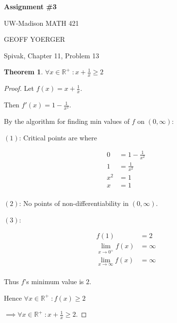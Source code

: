\documentclass{article} %
\theoremstyle{plain}
\newtheorem*{theorem*}{Theorem}
\theoremstyle{definition}
\begin{document}
\begin{center}
    \Large{
        \textbf{Assignment \#3}

        UW-Madison MATH 421
    }
    
    \vspace{5pt}
        
    \normalsize{
        GEOFF YOERGER

        \usdate
    }
    
    \vspace{15pt}
\end{center}

\noindent{} Spivak, Chapter 11, Problem 13

\begin{theorem*}
    $\forall x \in \mathbb{R}^+ \; \colon x + \frac{1}{x} \geq 2$
\end{theorem*}

\begin{proof}
    Let $f(x) = x + \frac{1}{x}$.

    Then $f'(x) = 1 - \frac{1}{x^2}$.

    By the algorithm for finding min values of $f$ on $(0, \infty)$:

    $(1)$: Critical points are where

    \begin{align*}
        0 & = 1 - \frac{1}{x^2} \\
        1 & =  \frac{1}{x^2} \\
        x^2 & = 1 \\
        x & = 1 \\
    \end{align*}

    $(2)$: No points of non-differentiability in $(0, \infty)$.

    $(3)$:

    \begin{align*}
        f(1) & = 2 \\
        \lim_{x \to 0^+} f(x) & = \infty \\
        \lim_{x \to \infty} f(x) & = \infty \\
    \end{align*}

    Thus $f$'s minimum value is $2$.

    Hence $\forall x \in \mathbb{R}^+ \; \colon f(x) \geq 2$

    $\implies \forall x \in \mathbb{R}^+ \; \colon x + \frac{1}{x} \geq 2$.
\end{proof}
\end{document}
